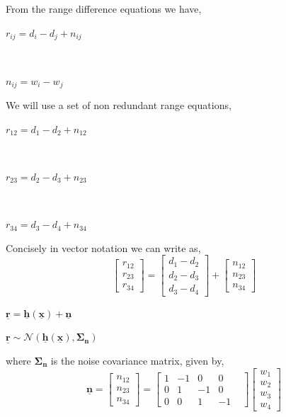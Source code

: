 \documentclass[a4 paper]{article}
\begin{document}
\setlength{\abovedisplayskip}{3pt}
\setlength{\belowdisplayskip}{3pt}


\solution From the range difference equations we have,
\\ \centerline{$ r_{ij} = d_{i} - d_{j} + n_{ij} $}
\\ \centerline{$ n_{ij} = w_{i} - w_{j} $}

We will use a set of non redundant range equations,
\\ \centerline{$ r_{12} = d_{1} - d_{2} + n_{12} $}
\\ \centerline{$ r_{23} = d_{2} - d_{3} + n_{23} $}
\\ \centerline{$ r_{34} = d_{3} - d_{4} + n_{34} $}

Concisely in vector notation we can write as,
\[
\begin{bmatrix}
r_{12} \\ r_{23} \\ r_{34}
\end{bmatrix}
=
\begin{bmatrix}
d_{1} - d_{2} \\ d_{2}-d_{3} \\ d_{3}-d_{4}
\end{bmatrix}
+
\begin{bmatrix}
n_{12} \\ n_{23} \\ n_{34}
\end{bmatrix}
\]

\centerline{$ \mathbf{\underline{r}} = \mathbf{\underline{h}(\mathbf{\underline{x}})} + \mathbf{\underline{n}} $}
\centerline{$ \mathbf{\underline{r}} \sim \mathcal{N}(\mathbf{\underline{h}(\mathbf{\underline{x}})}, \mathbf{\Sigma_{n}})$}
where $\mathbf{\Sigma_{n}}$ is the noise covariance matrix, given by,
\[
\mathbf{\underline{n}} = 
\begin{bmatrix}
n_{12} \\ n_{23} \\ n_{34}
\end{bmatrix}
=
\begin{bmatrix}
1 & -1 & 0 & 0 \\ 0 & 1 & -1 & 0 \\ 0 & 0& 1 & -1 & 
\end{bmatrix}
\begin{bmatrix}
w_{1} \\ w_{2} \\ w_{3} \\ w_{4}
\end{bmatrix}
\]
\end{document}
